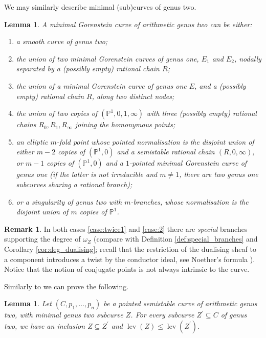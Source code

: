 \documentclass[11pt]{amsart}
\newcommand{\PP}{\mathbb P}
\newcommand{\lev}{\operatorname{lev}}
\theoremstyle{plain}
\newtheorem{lem}[thm]{Lemma}
\theoremstyle{definition}
\newtheorem{rem}[thm]{Remark}
\begin{document}
We may similarly describe minimal (sub)curves of genus two.
\begin{lem}\label{lem:min2}
 A minimal Gorenstein curve of arithmetic genus two can be either:
 \begin{enumerate}
  \item a smooth curve of genus two;
  \item the union of two minimal Gorenstein curves of genus one, $E_1$ and $E_2$, nodally separated by a (possibly empty) rational chain $R$;
  \item the union of a minimal Gorenstein curve of genus one $E$, and a (possibly empty) rational chain $R$, along two distinct nodes;
  \item the union of two copies of $(\PP^1,0,1,\infty)$ with three (possibly empty) rational chains $R_0, R_1, R_\infty$ joining the homonymous points;
  \item\label{case:twice1} an elliptic $m$-fold point whose pointed normalisation is the disjoint union of either $m-2$ copies of $(\PP^1,0)$ and a semistable rational chain $(R,0,\infty)$, or $m-1$ copies of $(\PP^1,0)$ and a $1$-pointed minimal Gorenstein curve of genus one (if the latter is not irreducible and $m\neq 1$, there are two genus one subcurves sharing a rational branch);
  \item\label{case:2} or a singularity of genus two with $m$-branches, whose normalisation is the disjoint union of $m$ copies of $\PP^1$.
 \end{enumerate}

\end{lem}
\begin{rem}\label{rem:special}
In both cases \eqref{case:twice1} and \eqref{case:2} there are \emph{special} branches supporting the degree of $\omega_Z$ (compare with Definition \ref{def:special_branches} and Corollary \ref{cor:deg_dualising}; recall that the restriction of the dualising sheaf to a component introduces a twist by the conductor ideal, see Noether's formula \cite[Proposition 1.2]{Catanese}). Notice that the notion of conjugate points is not always intrinsic to the curve.\end{rem}

Similarly to \cite[Corollary 3.2, Lemma 3.5]{SMY1} we can prove the following.
\begin{lem}
 Let $(C,p_1,\ldots,p_n)$ be a pointed \emph{semistable} curve of arithmetic genus two, with minimal genus two subcurve $Z$. For every subcurve $Z^\prime\subseteq C$ of genus two, we have an inclusion $Z\subseteq Z^\prime$ and $\lev(Z)\leq\lev(Z^\prime)$.
\end{lem}
\end{document}
